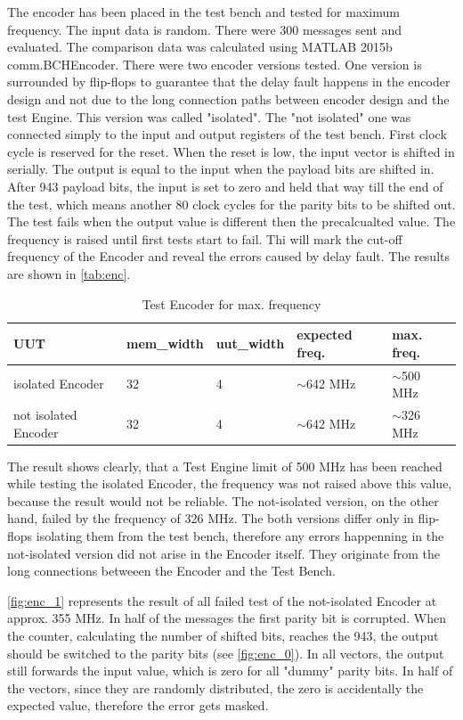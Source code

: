 The encoder has been placed in the test bench and tested for maximum frequency. The input data is random. There were 300 messages sent and evaluated. The comparison data was calculated using MATLAB 2015b comm.BCHEncoder. There were two encoder versions tested. One version is surrounded by flip-flops to guarantee that the delay fault happens in the encoder design and not due to the long connection paths between encoder design and the test Engine. This version was called "isolated". The "not isolated" one was connected simply to the input and output registers of the test bench. First clock cycle is reserved for the reset. When the reset is low, the input vector is shifted in serially. The output is equal to the input when the payload bits are shifted in. After 943 payload bits, the input is set to zero and held that way till the end of the test, which means another 80 clock cycles for the parity bits to be shifted out. The test fails when the output value is different then the precalcualted value. The frequency is raised until first tests start to fail. Thi will mark the cut-off frequency of the Encoder and reveal the errors caused by delay fault. The results are shown in \autoref{tab:enc}.

\begin{table}[h]
\begin{tabular}{@{}lllll@{}}
\toprule
UUT                       &mem\_width   &uut\_width &expected freq. &max. freq.\\ 
\midrule
isolated Encoder                  & 32          & 4      & $\sim$642 MHz & $\sim$500 MHz \\
not isolated Encoder              & 32          & 4      & $\sim$642 MHz & $\sim$326 MHz \\
\bottomrule
\end{tabular}
\centering
\caption{Test Encoder for max. frequency}\label{tab:enc}
\end{table}

The result shows clearly, that a Test Engine limit of 500 MHz has been reached while testing the isolated Encoder, the frequency was not raised above this value, because the result would not be reliable. The not-isolated version, on the other hand, failed by the frequency of 326 MHz. The both versions differ only in flip-flops isolating them from the test bench, therefore any errors happenning in the not-isolated version did not arise in the Encoder itself. They originate from the long connections betweeen the Encoder and the Test Bench. 

\autoref{fig:enc_1} represents the result of all failed test of the not-isolated Encoder at approx. 355 MHz. In half of the messages the first parity bit is corrupted. When the counter, calculating the number of shifted bits, reaches the 943, the output should be switched to the parity bits (see \autoref{fig:enc_0}). In all vectors, the output still forwards the input value, which is zero for all "dummy" parity bits. In half of the vectors, since they are randomly distributed, the zero is accidentally the expected value, therefore the error gets masked.

